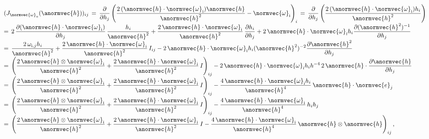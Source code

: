 \begin{equation}
\renewcommand*{\arraystretch}{2}
\begin{array}{l}
\displaystyle (J_{\normvec{\omega}_{\text{o}}}(\anormvec{h}))_{ij} \,=\, \frac{\partial}{\partial h_{j}}\left(\frac{2\,(\anormvec{h}\cdot\normvec{\omega}_{\text{i}})\anormvec{h}}{\anormvec{h}^2} - \normvec{\omega}_{\text{i}}\right)_i  \,=\, \frac{\partial}{\partial h_{j}}\left(\frac{2\,(\anormvec{h}\cdot\normvec{\omega}_{\text{i}})h_i}{\anormvec{h}^2}\right) \\
\displaystyle =\, 2\,\frac{\partial(\anormvec{h}\cdot\normvec{\omega}_{\text{i}})}{\partial h_{j}}\,\frac{h_i}{\anormvec{h}^2} +
\frac{2\,\anormvec{h}\cdot\normvec{\omega}_{\text{i}}}{\anormvec{h}^2}\,\frac{\partial h_i}{\partial h_{j}} +
2\,\anormvec{h}\cdot\normvec{\omega}_{\text{i}}h_i\frac{\partial(\anormvec{h}^2)^{-1}}{\partial h_{j}} \\
\displaystyle =\, \frac{2\,\omega_{\text{i},j}h_i}{\anormvec{h}^2} +
\frac{2\,\anormvec{h}\cdot\normvec{\omega}_{\text{i}}}{\anormvec{h}^2}\,I_{ij} -
2\,\anormvec{h}\cdot\normvec{\omega}_{\text{i}}h_i(\anormvec{h}^2)^{-2} \frac{\partial\anormvec{h}^2}{\partial h_{j}} \\
\displaystyle =\, \left(
\frac{2\,\anormvec{h}\otimes\normvec{\omega}_{\text{i}}}{\anormvec{h}^2} +
\frac{2\,\anormvec{h}\cdot\normvec{\omega}_{\text{i}}}{\anormvec{h}^2}\,I\right)_{ij} -
2\,\anormvec{h}\cdot\normvec{\omega}_{\text{i}}h_i h^{-4}\,2\,\anormvec{h}\cdot\frac{\partial\anormvec{h}}{\partial h_{j}} \\
\displaystyle =\, \left(
\frac{2\,\anormvec{h}\otimes\normvec{\omega}_{\text{i}}}{\anormvec{h}^2} +
\frac{2\,\anormvec{h}\cdot\normvec{\omega}_{\text{i}}}{\anormvec{h}^2}\,I\right)_{ij} -
\frac{4\,\anormvec{h}\cdot\normvec{\omega}_{\text{i}}h_i}{\anormvec{h}^4}\,\anormvec{h}\cdot\normvec{e}_j \\
\displaystyle =\, \left(
\frac{2\,\anormvec{h}\otimes\normvec{\omega}_{\text{i}}}{\anormvec{h}^2} +
\frac{2\,\anormvec{h}\cdot\normvec{\omega}_{\text{i}}}{\anormvec{h}^2}\,I\right)_{ij} -
\frac{4\,\anormvec{h}\cdot\normvec{\omega}_{\text{i}}}{\anormvec{h}^4}\,h_i h_j \\
\displaystyle =\, \left(
\frac{2\,\anormvec{h}\otimes\normvec{\omega}_{\text{i}}}{\anormvec{h}^2} +
\frac{2\,\anormvec{h}\cdot\normvec{\omega}_{\text{i}}}{\anormvec{h}^2}\,I -
\frac{4\,\anormvec{h}\cdot\normvec{\omega}_{\text{i}}}{\anormvec{h}^4}\,\anormvec{h}\otimes\anormvec{h}\right)_{ij},
\end{array}
\end{equation}


